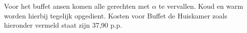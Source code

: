 Voor het buffet ansen komen alle gerechten met $\alpha$ te vervallen.
Koud en warm worden hierbij tegelijk opgedient. Kosten voor Buffet de Huiskamer zoals hieronder vermeld staat zijn 37,90 p.p.
